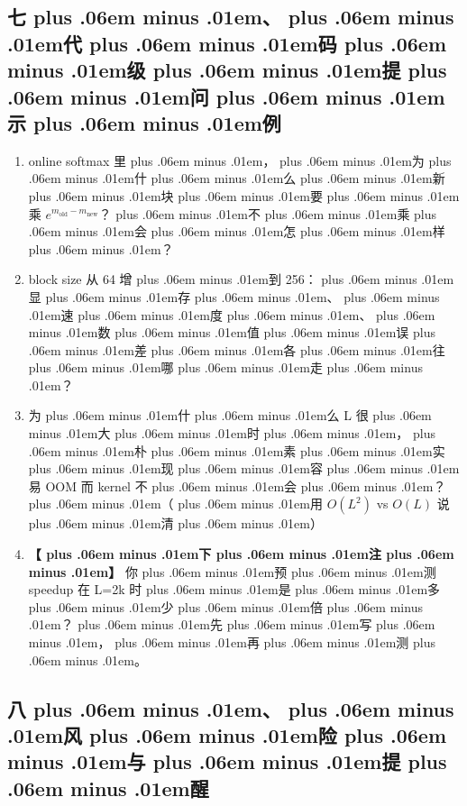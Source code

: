 \documentclass[
]{article}
\providecommand{\tightlist}{%
  \setlength{\itemsep}{0pt}\setlength{\parskip}{0pt}}
\def\zh#1{{\zhfont #1}}
\def\zhglue{\hskip0pt plus .06em minus .01em}
\begin{document}
\subsection{\zh{七\zhglue 、\zhglue 代\zhglue 码\zhglue 级\zhglue 提\zhglue 问\zhglue 示\zhglue 例}}\label{ux4e03ux4ee3ux7801ux7ea7ux63d0ux95eeux793aux4f8b}

\begin{enumerate}
\def\labelenumi{\arabic{enumi}.}
\tightlist
\item
  online softmax \zh{里\zhglue ，\zhglue 为\zhglue 什\zhglue 么\zhglue 新\zhglue 块\zhglue 要\zhglue 乘} \(e^{m_{\text{old}}-m_{\text{new}}}\)\zh{？\zhglue 不\zhglue 乘\zhglue 会\zhglue 怎\zhglue 样\zhglue ？}
\item
  block size \zh{从} 64 \zh{增\zhglue 到} 256\zh{：\zhglue 显\zhglue 存\zhglue 、\zhglue 速\zhglue 度\zhglue 、\zhglue 数\zhglue 值\zhglue 误\zhglue 差\zhglue 各\zhglue 往\zhglue 哪\zhglue 走\zhglue ？}
\item
  \zh{为\zhglue 什\zhglue 么} L \zh{很\zhglue 大\zhglue 时\zhglue ，\zhglue 朴\zhglue 素\zhglue 实\zhglue 现\zhglue 容\zhglue 易} OOM \zh{而} kernel \zh{不\zhglue 会\zhglue ？\zhglue （\zhglue 用} \(O(L^2)\) vs \(O(L)\) \zh{说\zhglue 清\zhglue ）}
\item
  \textbf{\zh{【\zhglue 下\zhglue 注\zhglue 】}} \zh{你\zhglue 预\zhglue 测} speedup \zh{在} L=2k \zh{时\zhglue 是\zhglue 多\zhglue 少\zhglue 倍\zhglue ？\zhglue 先\zhglue 写\zhglue ，\zhglue 再\zhglue 测\zhglue 。}
\end{enumerate}

\subsection{\zh{八\zhglue 、\zhglue 风\zhglue 险\zhglue 与\zhglue 提\zhglue 醒}}\label{ux516bux98ceux9669ux4e0eux63d0ux9192}
\end{document}

